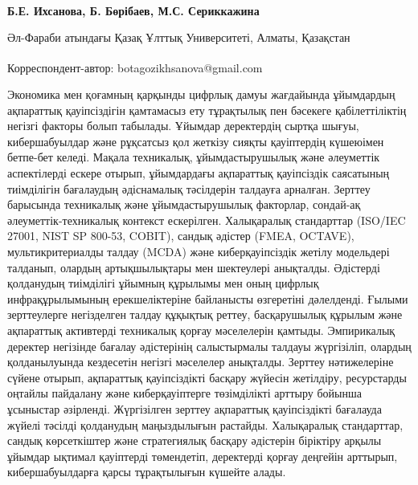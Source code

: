 
\begin{articleheader}

{\bfseries
Б.Е. Ихсанова\textsuperscript{\envelope },
Б. Бөрібаев,
М.С. Сериккажина 
}
\end{articleheader}

\begin{affiliation}
Әл-Фараби атындағы Қазақ Ұлттық Университеті, Алматы, Қазақстан

\raggedright \textsuperscript{\envelope }Корреспондент-автор: botagozikhsanova@gmail.com
\end{affiliation}

Экономика мен қоғамның қарқынды цифрлық дамуы жағдайында ұйымдардың
ақпараттық қауіпсіздігін қамтамасыз ету тұрақтылық пен бәсекеге
қабілеттіліктің негізгі факторы болып табылады. Ұйымдар деректердің
сыртқа шығуы, кибершабуылдар және рұқсатсыз қол жеткізу сияқты
қауіптердің күшеюімен бетпе-бет келеді. Мақала техникалық,
ұйымдастырушылық және әлеуметтік аспектілерді ескере отырып, ұйымдардағы
ақпараттық қауіпсіздік саясатының тиімділігін бағалаудың әдіснамалық
тәсілдерін талдауға арналған. Зерттеу барысында техникалық және
ұйымдастырушылық факторлар, сондай-ақ әлеуметтік-техникалық контекст
ескерілген. Халықаралық стандарттар (ISO/IEC 27001, NIST SP 800-53,
COBIT), сандық әдістер (FMEA, OCTAVE), мультикритериалды талдау (MCDA)
және киберқауіпсіздік жетілу модельдері талданып, олардың артықшылықтары
мен шектеулері анықталды. Әдістерді қолданудың тиімділігі ұйымның
құрылымы мен оның цифрлық инфрақұрылымының ерекшеліктеріне байланысты
өзгеретіні дәлелденді. Ғылыми зерттеулерге негізделген талдау құқықтық
реттеу, басқарушылық құрылым және ақпараттық активтерді техникалық
қорғау мәселелерін қамтыды. Эмпирикалық деректер негізінде бағалау
әдістерінің салыстырмалы талдауы жүргізіліп, олардың қолданылуында
кездесетін негізгі мәселелер анықталды. Зерттеу нәтижелеріне сүйене
отырып, ақпараттық қауіпсіздікті басқару жүйесін жетілдіру, ресурстарды
оңтайлы пайдалану және киберқауіптерге төзімділікті арттыру бойынша
ұсыныстар әзірленді. Жүргізілген зерттеу ақпараттық қауіпсіздікті
бағалауда жүйелі тәсілді қолданудың маңыздылығын растайды. Халықаралық
стандарттар, сандық көрсеткіштер және стратегиялық басқару әдістерін
біріктіру арқылы ұйымдар ықтимал қауіптерді төмендетіп, деректерді
қорғау деңгейін арттырып, кибершабуылдарға қарсы тұрақтылығын күшейте
алады.

